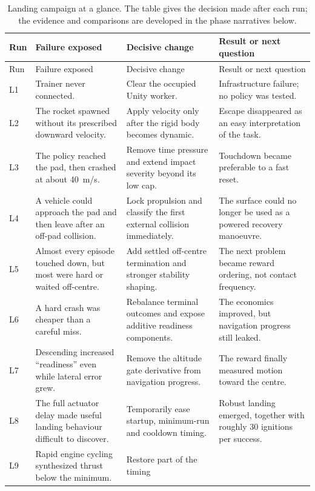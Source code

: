 \footnotesize
\begin{longtable}{p{}p{}p{}p{}}
  \caption{Landing campaign at a glance. The table gives the decision made after each run; the
  evidence and comparisons are developed in the phase narratives below.}
  \label{tab:landing-iterations}\\
  \toprule
  Run & Failure exposed & Decisive change & Result or next question \\
  \midrule
  \endfirsthead
  \toprule
  Run & Failure exposed & Decisive change & Result or next question \\
  \midrule
  \endhead
  L1 & Trainer never connected. & Clear the occupied Unity worker. & Infrastructure failure;
  no policy was tested. \\
  L2 & The rocket spawned without its prescribed downward velocity. & Apply velocity only after
  the rigid body becomes dynamic. & Escape disappeared as an easy interpretation of the task. \\
  L3 & The policy reached the pad, then crashed at about \SI{40}{m/s}. & Remove time pressure and
  extend impact severity beyond its low cap. & Touchdown became preferable to a fast reset. \\
  L4 & A vehicle could approach the pad and then leave after an off-pad collision. & Lock
  propulsion and classify the first external collision immediately. & The surface could no
  longer be used as a powered recovery manoeuvre. \\
  L5 & Almost every episode touched down, but most were hard or waited off-centre. & Add settled
  off-centre termination and stronger stability shaping. & The next problem became reward
  ordering, not contact frequency. \\
  L6 & A hard crash was cheaper than a careful miss. & Rebalance terminal outcomes and expose
  additive readiness components. & The economics improved, but navigation progress still leaked. \\
  L7 & Descending increased ``readiness'' even while lateral error grew. & Remove the altitude
  gate derivative from navigation progress. & The reward finally measured motion toward the
  centre. \\
  L8 & The full actuator delay made useful landing behaviour difficult to discover. & Temporarily
  ease startup, minimum-run and cooldown timing. & Robust landing emerged, together with roughly
  30 ignitions per success. \\
  L9 & Rapid engine cycling synthesized thrust below the minimum. & Restore part of the timing

\end{longtable}
